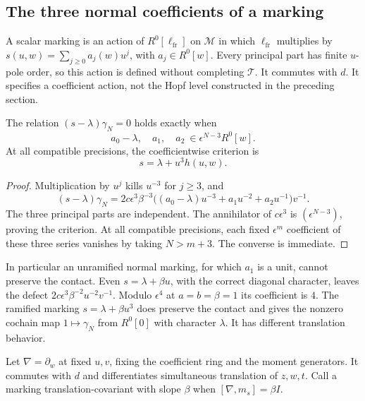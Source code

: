 \subsection{The three normal coefficients of a marking}

A scalar marking is an action of $R^0[\ell_{\mathrm{fr}}]$
on $\mathcal M$ in which $\ell_{\mathrm{fr}}$ multiplies by
$s(u,w)=\sum_{j\geq0}a_j(w)u^j$, with
$a_j\in R^0[w]$. Every principal part has finite $u$-pole
order, so this action is defined without completing
$\mathcal T$. It commutes with $d$.
It specifies a coefficient action, not the Hopf level
constructed in the preceding section.

\begin{proposition}\label{v4-arith:curve:prop:three-coefficients}
The relation $(s-\lambda)\gamma_N=0$ holds exactly when
\[
 a_0-\lambda,\quad a_1,\quad a_2
                    \ \in\epsilon^{N-3}R^0[w].
\]
At all compatible precisions, the coefficientwise criterion is
\[
 s=\lambda+u^3h(u,w).
\]
\end{proposition}
\begin{proof}
Multiplication by $u^j$ kills $u^{-3}$ for $j\geq3$, and
\[
 (s-\lambda)\gamma_N
 =2c\epsilon^3\beta^{-3}
       \bigl((a_0-\lambda)u^{-3}+a_1u^{-2}+a_2u^{-1}\bigr)v^{-1}.
\]
The three principal parts are independent. The annihilator
of $c\epsilon^3$ is $(\epsilon^{N-3})$, proving the criterion.
At all compatible precisions, each fixed $\epsilon^m$
coefficient of these three series vanishes by taking
$N>m+3$. The converse is immediate.
\end{proof}

In particular an unramified normal marking, for which
$a_1$ is a unit, cannot preserve the contact. Even
$s=\lambda+\beta u$, with the correct diagonal character,
leaves the defect $2c\epsilon^3\beta^{-2}u^{-2}v^{-1}$.
Modulo $\epsilon^4$ at $a=b=\beta=1$ its coefficient is $4$.
The ramified marking $s=\lambda+\beta u^3$ does preserve
the contact and gives the nonzero cochain map
$1\mapsto\gamma_N$ from $R^0[0]$ with character $\lambda$.
It has different translation behavior.

Let $\nabla=\partial_w$ at fixed $u,v$, fixing the
coefficient ring and the moment generators.
It commutes with $d$ and differentiates simultaneous
translation of $z,w,t$.
Call a marking translation-covariant with slope $\beta$
when $[\nabla,m_s]=\beta I$.

